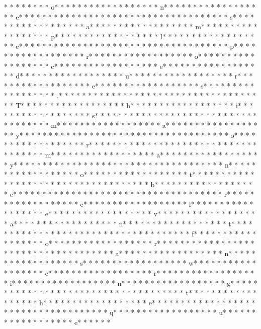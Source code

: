  * * *  *  * * *  * o* * *  * * *  * * *  *  * * *  *  * * *  * n* * *  * * *  * * *  *  * * *  *  * * *  * e* * *  * * *  * * *  *  * * *  *  * * *  *  * * *  * * *  * * *  *  * * *  *  * * *  * s* * *  * * *  * * *  *  * * *  *  * * *  * a* * *  * * *  * * *  *  * * *  *  * * *  * m* * *  * * *  * * *  *  * * *  *  * * *  * p* * *  * * *  * * *  *  * * *  *  * * *  * l* * *  * * *  * * *  *  * * *  *  * * *  * e* * *  * * *  * * *  *  * * *  *  * * *  *  * * *  * * *  * * *  *  * * *  *  * * *  * p* * *  * * *  * * *  *  * * *  *  * * *  * r* * *  * * *  * * *  *  * * *  *  * * *  * o* * *  * * *  * * *  *  * * *  *  * * *  * c* * *  * * *  * * *  *  * * *  *  * * *  * e* * *  * * *  * * *  *  * * *  *  * * *  * d* * *  * * *  * * *  *  * * *  *  * * *  * u* * *  * * *  * * *  *  * * *  *  * * *  * r* * *  * * *  * * *  *  * * *  *  * * *  * e* * *  * * *  * * *  *  * * *  *  * * *  * s* * *  * * *  * * *  *  * * *  *  * * *  * .* * *  * * *  * * *  *  * * *  *  * * *  *  * * *  * * *  * * *  *  * * *  *  * * *  * T* * *  * * *  * * *  *  * * *  *  * * *  * h* * *  * * *  * * *  *  * * *  *  * * *  * i* * *  * * *  * * *  *  * * *  *  * * *  * s* * *  * * *  * * *  *  * * *  *  * * *  *  * * *  * * *  * * *  *  * * *  *  * * *  * m* * *  * * *  * * *  *  * * *  *  * * *  * a* * *  * * *  * * *  *  * * *  *  * * *  * y* * *  * * *  * * *  *  * * *  *  * * *  *  * * *  * * *  * * *  *  * * *  *  * * *  * o* * *  * * *  * * *  *  * * *  *  * * *  * r* * *  * * *  * * *  *  * * *  *  * * *  *  * * *  * * *  * * *  *  * * *  *  * * *  * m* * *  * * *  * * *  *  * * *  *  * * *  * a* * *  * * *  * * *  *  * * *  *  * * *  * y* * *  * * *  * * *  *  * * *  *  * * *  *  * * *  * * *  * * *  *  * * *  *  * * *  * n* * *  * * *  * * *  *  * * *  *  * * *  * o* * *  * * *  * * *  *  * * *  *  * * *  * t* * *  * * *  * * *  *  * * *  *  * * *  *  * * *  * * *  * * *  *  * * *  *  * * *  * b* * *  * * *  * * *  *  * * *  *  * * *  * e* * *  * * *  * * *  *  * * *  *  * * *  *  * * *  * * *  * * *  *  * * *  *  * * *  * r* * *  * * *  * * *  *  * * *  *  * * *  * e* * *  * * *  * * *  *  * * *  *  * * *  * l* * *  * * *  * * *  *  * * *  *  * * *  * e* * *  * * *  * * *  *  * * *  *  * * *  * v* * *  * * *  * * *  *  * * *  *  * * *  * a* * *  * * *  * * *  *  * * *  *  * * *  * n* * *  * * *  * * *  *  * * *  *  * * *  * t* * *  * * *  * * *  *  * * *  *  * * *  *  * * *  * * *  * * *  *  * * *  *  * * *  * f* * *  * * *  * * *  *  * * *  *  * * *  * o* * *  * * *  * * *  *  * * *  *  * * *  * r* * *  * * *  * * *  *  * * *  *  * * *  *  * * *  * * *  * * *  *  * * *  *  * * *  * a* * *  * * *  * * *  *  * * *  *  * * *  * n* * *  * * *  * * *  *  * * *  *  * * *  * s* * *  * * *  * * *  *  * * *  *  * * *  * w* * *  * * *  * * *  *  * * *  *  * * *  * e* * *  * * *  * * *  *  * * *  *  * * *  * r* * *  * * *  * * *  *  * * *  *  * * *  * i* * *  * * *  * * *  *  * * *  *  * * *  * n* * *  * * *  * * *  *  * * *  *  * * *  * g* * *  * * *  * * *  *  * * *  *  * * *  *  * * *  * * *  * * *  *  * * *  *  * * *  * t* * *  * * *  * * *  *  * * *  *  * * *  * h* * *  * * *  * * *  *  * * *  *  * * *  * e* * *  * * *  * * *  *  * * *  *  * * *  *  * * *  * * *  * * *  *  * * *  *  * * *  * q* * *  * * *  * * *  *  * * *  *  * * *  * u* * *  * * *  * * *  *  * * *  *  * * *  * e* * *  * * *  